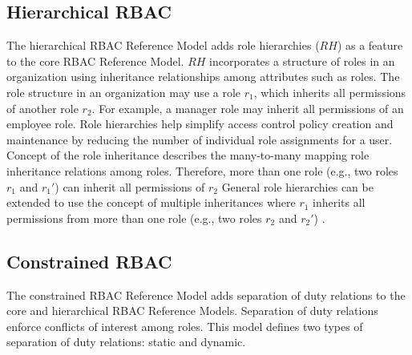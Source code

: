 \subsection{Hierarchical RBAC} 

The hierarchical RBAC Reference Model adds role hierarchies ($RH$) as a feature to the core RBAC Reference Model.
$RH$ incorporates a structure of roles in an organization using inheritance relationships among attributes such as roles.
The role structure in an organization may use
a role $r_1$, which inherits all permissions of another role $r_2$.
For example, a manager role may inherit all permissions of an employee role.
Role hierarchies help simplify access control policy creation and maintenance by reducing the number of
individual role assignments for a user. 
Concept of the role inheritance describes the many-to-many mapping role inheritance relations among roles.
Therefore, more than one role (e.g., two roles $r_1$ and $r_1'$) can inherit all permissions of $r_2$ 
General role hierarchies can be extended to use the concept of multiple inheritances where
$r_1$ inherits all permissions from more than one role (e.g., two roles $r_2$ and $r_2'$) .


\subsection{Constrained RBAC}

The constrained RBAC Reference Model adds separation of duty relations to the core and hierarchical RBAC Reference Models. 
Separation of duty relations enforce conflicts of interest among roles. This model defines two types of separation of duty relations: static and dynamic.

